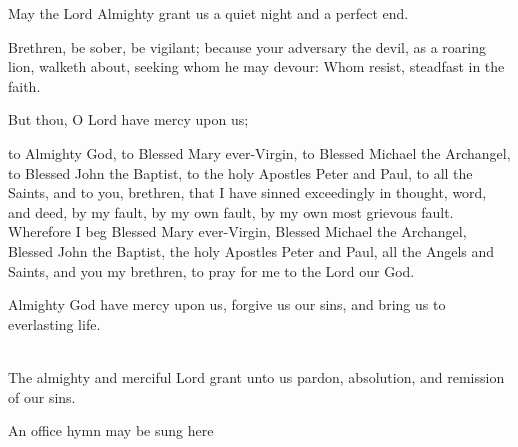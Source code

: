 
May the Lord Almighty grant us a quiet night and a perfect end.\\

Brethren, be sober, be vigilant; because your adversary the devil, as a roaring lion,
walketh about, seeking whom he may devour: Whom resist, steadfast in the faith.

But thou, O Lord have mercy upon us;\\

 to Almighty God, to Blessed Mary ever-Virgin, to Blessed Michael
the Archangel, to Blessed John the Baptist, to the holy Apostles Peter and
Paul, to all the Saints, and to you, brethren, that I have sinned exceedingly in
thought, word, and deed, by my fault, by my own fault, by my own most
grievous fault. Wherefore I beg Blessed Mary ever-Virgin, Blessed Michael
the Archangel, Blessed John the Baptist, the holy Apostles Peter and Paul, all
the Angels and Saints, and you my brethren, to pray for me to the Lord our God.

Almighty God have mercy upon us, forgive us our sins, and bring us to everlasting life.\\

\\
The almighty and merciful Lord grant unto us pardon, absolution, and remission of our sins.\\


\begin{rubric}
An office hymn may be sung here
\end{rubric}

